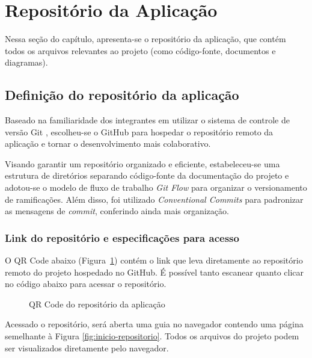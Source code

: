 \section{Repositório da Aplicação}

Nessa seção do capítulo, apresenta-se o repositório da aplicação, que contém todos os arquivos relevantes ao projeto (como código-fonte, documentos e diagramas).

\subsection{Definição do repositório da aplicação}

Baseado na familiaridade dos integrantes em utilizar o sistema de controle de versão Git \cite{git-2025}, escolheu-se o GitHub \cite{github-2025} para hospedar o repositório remoto da aplicação e tornar o desenvolvimento mais colaborativo.

Visando garantir um repositório organizado e eficiente, estabeleceu-se uma estrutura de diretórios separando código-fonte da documentação do projeto e adotou-se o modelo de fluxo de trabalho \textit{Git Flow} \cite{gitflow-2023} para organizar o versionamento de ramificações. Além disso, foi utilizado \textit{Conventional Commits} \cite{convcommits-2025} para padronizar as mensagens de \textit{commit}, conferindo ainda mais organização.

\subsubsection{Link do repositório e especificações para acesso}

O QR Code abaixo (Figura~\ref{fig:qrcode-repositorio}) contém o link que leva diretamente ao repositório remoto do projeto hospedado no GitHub. É possível tanto escanear quanto clicar no código abaixo para acessar o repositório.

\begin{figure}[h]
	\centering
		\caption{QR Code do repositório da aplicação}
		\label{fig:qrcode-repositorio}
\end{figure}

Acessado o repositório, será aberta uma guia no navegador contendo uma página semelhante à Figura \ref{fig:inicio-repositorio}. Todos os arquivos do projeto podem ser visualizados diretamente pelo navegador.

